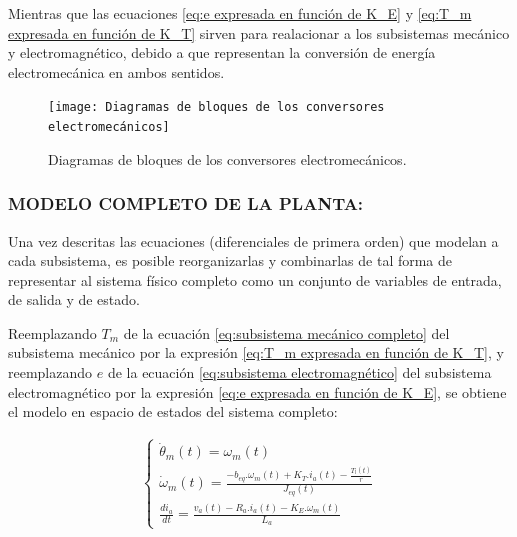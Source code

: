 \documentclass{article}
\begin{document}
\begin{sloppypar}
Mientras que las ecuaciones \ref{eq:e expresada en función de K_E} y \ref{eq:T_m expresada en función de K_T} sirven para realacionar a los subsistemas mecánico y electromagnético, debido a que representan la conversión de energía electromecánica en ambos sentidos.


\begin{figure}[H]
    \centering
    \texttt{[image: Diagramas de bloques de los conversores electromecánicos]}
    \caption{Diagramas de bloques de los conversores electromecánicos.}
    \label{fig:Diagramas de bloques de los conversores electromecánicos}
\end{figure}


\subsubsection{MODELO COMPLETO DE LA PLANTA:}
\label{sec:MODELO COMPLETO DE LA PLANTA:}

Una vez descritas las ecuaciones (diferenciales de primera orden) que modelan a cada subsistema, es posible reorganizarlas y combinarlas de tal forma de representar al sistema físico completo como un conjunto de variables de entrada, de salida y de estado.

Reemplazando $T_m$ de la ecuación \ref{eq:subsistema mecánico completo} del subsistema mecánico por la expresión \ref{eq:T_m expresada en función de K_T}, y reemplazando $e$ de la ecuación \ref{eq:subsistema electromagnético} del subsistema electromagnético por la expresión \ref{eq:e expresada en función de K_E}, se obtiene el modelo en espacio de estados del sistema completo:

\begin{align} \label{eq:modelo completo de la planta}
    \begin{cases}
        \dot{\theta}_m\left(t\right)=\omega_m\left(t\right)
        \\
        \dot{\omega}_m\left(t\right)=\frac{ -b_{eq}.\omega_m(t)+K_T.i_a(t)-\frac{T_l\left(t\right)}{r} }{ J_{eq}(t) }
        \\
        \frac{di_a}{dt}=\frac{v_a(t)-R_a.i_a(t)-K_E.\omega_m(t)}{L_a}
    \end{cases}
\end{align}


\end{sloppypar}
\end{document}
